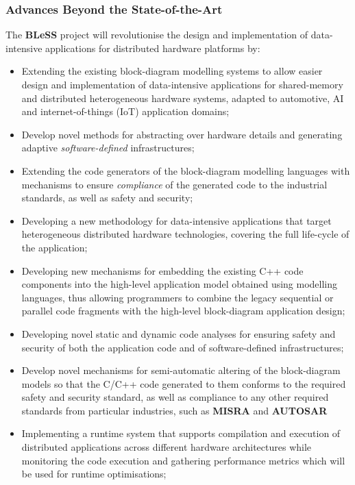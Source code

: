 \documentclass[a4paper,11pt]{article}
\newcommand{\project}[1]{\textbf{#1}\xspace}
\newcommand{\BLESS}{\project{BLeSS}}
\newcommand{\TheProject}{\BLESS}
\begin{document}
\subsubsection{Advances Beyond the State-of-the-Art}
\label{sec:novelty}
\label{sect:background}
\label{sect:state-of-the-art}




The \TheProject{} project will revolutionise the design and implementation of
data-intensive applications for distributed hardware platforms by:
\begin{itemize}
\item Extending the existing block-diagram modelling systems to allow easier design and implementation of data-intensive applications for shared-memory and distributed heterogeneous hardware systems, adapted to automotive, AI and internet-of-things (IoT) application domains;
\item Develop novel methods for abstracting over hardware details and generating adaptive \emph{software-defined} infrastructures;
\item Extending the code generators of the block-diagram modelling languages with mechanisms to ensure \emph{compliance} of the generated code to the industrial standards, as well as safety and security;
\item Developing a new methodology for data-intensive applications that target heterogeneous distributed hardware technologies, covering the full life-cycle of the application;
\item Developing new mechanisms for embedding the existing C++ code components into the high-level
  application model obtained using modelling languages, thus allowing programmers to combine the legacy
  sequential or parallel code fragments with the high-level block-diagram application design;
\item Developing novel static and dynamic code analyses for ensuring safety and security of both the application code and of software-defined infrastructures;
\item Develop novel mechanisms for semi-automatic altering of the block-diagram models so that the C/C++ code generated to them conforms to the required safety and security standard, as well as compliance to any other required standards from particular industries, such as \textbf{MISRA} and \textbf{AUTOSAR}
\item Implementing a runtime system that supports compilation and execution of distributed applications across different hardware architectures while monitoring the code execution and gathering performance metrics which will be used for runtime optimisations;

\end{itemize}
\end{document}
